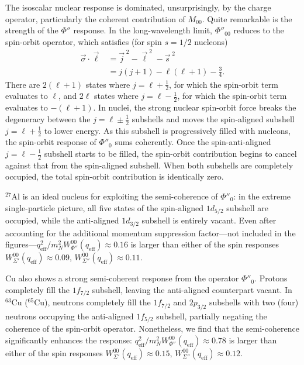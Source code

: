 \documentclass{book}[letterpaper,12pt]
\begin{document}
The isoscalar nuclear response is dominated, unsurprisingly, by the charge operator, particularly the coherent contribution of $M_{00}$. Quite remarkable is the strength of the $\Phi''$ response. In the long-wavelength limit, $\Phi''_{00}$ reduces to the spin-orbit operator, which satisfies (for spin $s=1/2$ nucleons)
\begin{equation}
\begin{split}
\vec{\sigma}\cdot\vec{\ell}&=\vec{j}^{\;2}-\vec{\ell}^{\;2}-\vec{s}^{\;2}\\
&=j(j+1)-\ell(\ell+1)-\frac{3}{4}.
\end{split}
\end{equation}
There are $2(\ell+1)$ states where $j=\ell+\frac{1}{2}$, for which the spin-orbit term evaluates to $\ell$, and $2\ell$ states where $j=\ell-\frac{1}{2}$, for which the spin-orbit term evaluates to $-(\ell+1)$. In nuclei, the strong nuclear spin-orbit force breaks the degeneracy between the $j=\ell\pm\frac{1}{2}$ subshells and moves the spin-aligned subshell $j=\ell+\frac{1}{2}$ to lower energy. As this subshell is progressively filled with nucleons, the spin-orbit response of $\Phi''_{0}$ sums coherently. Once the spin-anti-aligned $j=\ell-\frac{1}{2}$ subshell starts to be filled, the spin-orbit contribution begins to cancel against that from the spin-aligned subshell. When both subshells are completely occupied, the total spin-orbit contribution is identically zero.

$^{27}$Al is an ideal nucleus for exploiting the semi-coherence of $\Phi''_{0}$: in the extreme single-particle picture, all five states of the spin-aligned $1d_{5/2}$ subshell are occupied, while the anti-aligned $1d_{3/2}$ subshell is entirely vacant. Even after accounting for the additional momentum suppression factor---not included in the figures---$q_\mathrm{eff}^2/m_N^2W_{\Phi''}^{00}(q_\mathrm{eff})\approx 0.16$ is larger than either of the spin responses $W_{\Sigma'}^{00}(q_\mathrm{eff})\approx 0.09$, $W_{\Sigma''}^{00}(q_\mathrm{eff})\approx 0.11$. 

Cu also shows a strong semi-coherent response from the operator $\Phi''_0$. Protons completely fill the $1f_{7/2}$ subshell, leaving the anti-aligned counterpart vacant. In $^{63}$Cu ($^{65}$Cu), neutrons completely fill the $1f_{7/2}$ and $2p_{3/2}$ subshells with two (four) neutrons occupying the anti-aligned $1f_{5/2}$ subshell, partially negating the coherence of the spin-orbit operator.  Nonetheless, we find that the semi-coherence significantly enhances the response: $q_\mathrm{eff}^2/m_N^2W_{\Phi''}^{00}(q_\mathrm{eff})\approx 0.78$ is larger than either of the spin responses $W_{\Sigma'}^{00}(q_\mathrm{eff})\approx 0.15$, $W_{\Sigma''}^{00}(q_\mathrm{eff})\approx 0.12$. 
\end{document}
